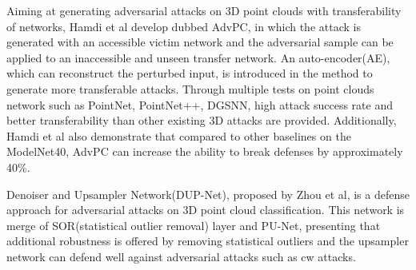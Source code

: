 Aiming at generating adversarial attacks on 3D point clouds with transferability of networks, Hamdi et al develop dubbed AdvPC\cite{vedaldi_advpc_2020}, in which the attack is generated with an accessible victim network and the adversarial sample can be applied to an inaccessible and unseen transfer network. An auto-encoder(AE), which can reconstruct the perturbed input, is introduced in the method to generate more transferable attacks. Through multiple tests on point clouds network such as PointNet, PointNet++, DGSNN, high attack success rate and better transferability than other existing 3D attacks are provided. Additionally, Hamdi et al also demonstrate that compared to other baselines on the ModelNet40, AdvPC can increase the ability to break defenses by approximately 40\%.

Denoiser and Upsampler Network(DUP-Net\cite{zhou_dup-net_2019}), proposed by Zhou et al, is a defense approach for adversarial attacks on 3D point cloud classification. This network is merge of SOR(statistical outlier removal\cite{rusu_towards_2008}) layer and PU-Net\cite{li_pu-gan_nodate}, presenting that additional robustness is offered by removing statistical outliers and the upsampler network can defend well against adversarial attacks such as \acrshort{cw} attacks.
